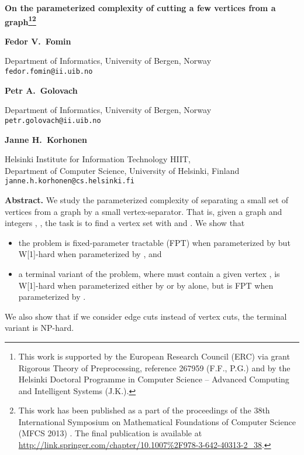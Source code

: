 \documentclass[a4paper,11pt]{article}
\theoremstyle{definition}
\theoremstyle{remark}
\newenvironment{myabstract}
               {\list{}{\listparindent 1.5em\itemindent    \listparindent
                        \leftmargin    0pt
                        \rightmargin   0pt
                        \parsep        0pt}\item\relax}
               {\endlist}
\newenvironment{mycover}
               {\list{}{\listparindent 0pt
                        \itemindent    \listparindent
                        \leftmargin    0pt
                        \rightmargin   0pt
                        \parsep        0pt}\raggedright
                \item\relax}
               {\endlist}
\begin{document}
\vspace*{2ex}
\begin{mycover}
{\LARGE \textbf{On the parameterized complexity of cutting a few vertices from a graph\footnote{This work is supported by the European Research Council (ERC) via grant Rigorous Theory of Preprocessing, reference 267959 (F.F., P.G.) and by the Helsinki Doctoral Programme in Computer Science -- Advanced Computing and Intelligent Systems (J.K.).}\footnote{This work has been published as a part of the proceedings of the 38th International Symposium on Mathematical Foundations of Computer Science ({MFCS} 2013) \cite{small-cuts-conf}. The final publication is available at \url{http://link.springer.com/chapter/10.1007\%2F978-3-642-40313-2_38}.}}\par}


\bigskip
\bigskip

\medskip
\textbf{Fedor V.\ Fomin}\\
{\small Department of Informatics, University of Bergen, Norway\\
\nolinkurl{fedor.fomin@ii.uib.no}\par}

\medskip
\textbf{Petr A.\ Golovach}\\
{\small Department of Informatics, University of Bergen, Norway\\
\nolinkurl{petr.golovach@ii.uib.no}\par}

\medskip
\textbf{Janne H.\ Korhonen}\\
{\small Helsinki Institute for Information Technology HIIT, \\
Department of Computer Science, University of Helsinki, Finland\\
\nolinkurl{janne.h.korhonen@cs.helsinki.fi}\par}
\end{mycover}

\bigskip
\bigskip

\begin{myabstract}
\noindent\textbf{Abstract.} We study the parameterized complexity of separating a small set of vertices from a graph by a small vertex-separator. That is, given a graph  and integers , , the task is to find a vertex set  with  and . We show that
\begin{itemize}
	\item the problem is fixed-parameter tractable (FPT) when parameterized by  but W[1]-hard when parameterized by , and
	\item a terminal variant of the problem, where  must contain a given vertex , is W[1]-hard when parameterized either by  or by  alone, but is FPT when parameterized by .  
\end{itemize}
We also show that if we consider edge cuts instead of vertex cuts, the terminal variant is NP-hard.
\end{myabstract}
\end{document}
